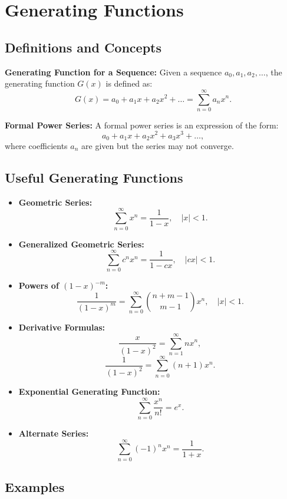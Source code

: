 \section{Generating Functions}

\subsection*{Definitions and Concepts}

\textbf{Generating Function for a Sequence:}
Given a sequence $a_0, a_1, a_2, \dots$, the generating function $G(x)$ is defined as:
\[
G(x) = a_0 + a_1x + a_2x^2 + \dots = \sum_{n=0}^\infty a_nx^n.
\]

\textbf{Formal Power Series:}
A formal power series is an expression of the form:
\[
a_0 + a_1x + a_2x^2 + a_3x^3 + \dots,
\]
where coefficients $a_n$ are given but the series may not converge.

\subsection*{Useful Generating Functions}

\begin{itemize}
    \item \textbf{Geometric Series:}
    \[ \sum_{n=0}^\infty x^n = \frac{1}{1-x}, \quad |x| < 1. \]

    \item \textbf{Generalized Geometric Series:}
    \[ \sum_{n=0}^\infty c^nx^n = \frac{1}{1-cx}, \quad |cx| < 1. \]

    \item \textbf{Powers of $(1-x)^{-m}$:}
    \[ \frac{1}{(1-x)^m} = \sum_{n=0}^\infty \binom{n+m-1}{m-1}x^n, \quad |x| < 1. \]

    \item \textbf{Derivative Formulas:}
    \[ \frac{x}{(1-x)^2} = \sum_{n=1}^\infty nx^n, \]
    \[ \frac{1}{(1-x)^2} = \sum_{n=0}^\infty (n+1)x^n. \]

    \item \textbf{Exponential Generating Function:}
    \[ \sum_{n=0}^\infty \frac{x^n}{n!} = e^x. \]

    \item \textbf{Alternate Series:}
    \[ \sum_{n=0}^\infty (-1)^n x^n = \frac{1}{1+x}. \]
\end{itemize}

\subsection*{Examples}

